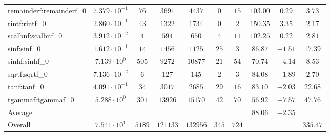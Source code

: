 \begin{tabular}{|l|c|c|c|c|c|c|c|c|c|}
remainderf:remainderf\_0 & $ 7.379 \cdot 10^{-1} $ & $ 76     $ & $ 3691   $ & $ 4437   $ & $ 0   $ & $ 15  $ & $ 103.00      $ & $ 0.29    $ & $ 3.73    $ \\
rintf:rintf\_0           & $ 2.860 \cdot 10^{-1} $ & $ 43     $ & $ 1322   $ & $ 1734   $ & $ 0   $ & $ 2   $ & $ 150.35      $ & $ 3.35    $ & $ 2.17    $ \\
scalbnf:scalbnf\_0       & $ 3.912 \cdot 10^{-2} $ & $ 4      $ & $ 594    $ & $ 650    $ & $ 4   $ & $ 11  $ & $ 102.25      $ & $ 0.22    $ & $ 2.81    $ \\
sinf:sinf\_0             & $ 1.612 \cdot 10^{-1} $ & $ 14     $ & $ 1456   $ & $ 1125   $ & $ 25  $ & $ 3   $ & $ 86.87       $ & $ -1.51   $ & $ 17.39   $ \\
sinhf:sinhf\_0           & $ 7.139 \cdot 10^{0}  $ & $ 505    $ & $ 9272   $ & $ 10877  $ & $ 21  $ & $ 54  $ & $ 70.74       $ & $ -4.14   $ & $ 8.53    $ \\
sqrtf:sqrtf\_0           & $ 7.136 \cdot 10^{-2} $ & $ 6      $ & $ 127    $ & $ 145    $ & $ 2   $ & $ 3   $ & $ 84.08       $ & $ -1.89   $ & $ 2.70    $ \\
tanf:tanf\_0             & $ 4.091 \cdot 10^{-1} $ & $ 34     $ & $ 3017   $ & $ 2685   $ & $ 29  $ & $ 16  $ & $ 83.10       $ & $ -2.03   $ & $ 22.68   $ \\
tgammaf:tgammaf\_0       & $ 5.288 \cdot 10^{0}  $ & $ 301    $ & $ 13926  $ & $ 15170  $ & $ 42  $ & $ 70  $ & $ 56.92       $ & $ -7.57   $ & $ 47.76   $ \\
\hline
Average                  & $                     $ & $        $ & $        $ & $        $ & $     $ & $     $ & $ 88.06       $ & $ -2.35   $ & $         $ \\
\hline
Overall                  & $ 7.541 \cdot 10^{1}  $ & $ 5189   $ & $ 121133 $ & $ 132956 $ & $ 345 $ & $ 724 $ & $             $ & $         $ & $ 335.47  $ \\
\hline
\end{tabular}
